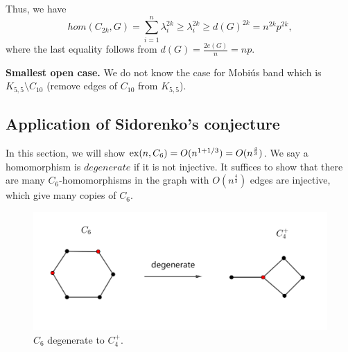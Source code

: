 \documentclass{article}
\theoremstyle{definition}
\begin{document}
Thus, we have
$$hom(C_{2k},G)=\sum_{i=1}^{n} \lambda_i^{2k}\geq \lambda_i^{2k}\geq d(G)^{2k}= n^{2k} p^{2k},$$
where the last equality follows from $d(G)=\frac{2e(G)}{n}=np$.

\textbf{Smallest open case.}
We do not know the case for Mobi\'{u}s band which is $K_{5,5}\setminus C_{10}$ (remove edges of $C_{10}$ from $K_{5,5}$).

\subsection{Application of Sidorenko's conjecture}

In this section, we will show ${\rm ex}(n,C_6)=O(n^{1+1/3})=O(n^{\frac{4}{3}})$. We say a homomorphism is $degenerate$ if it is not injective. It suffices to show that there are many $C_6$-homomorphisms in the graph with $O(n^{\frac{4}{3}})$ edges are injective, which give many copies of $C_6$.
\begin{figure}[h]
     \centering
     \includegraphics[scale=0.6]{10-1.png}
     \caption{$C_6$ degenerate to $C_4^+$.}
     \label{10-1}
\end{figure}
\end{document}

